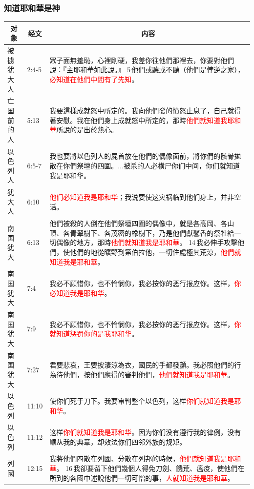 \subsubsection{知道耶和華是神}
\begin{table}[H]
\centering
\begin{tabular}{p{1.5cm}|p{}|p{14.0cm}}\hline\hline
\multicolumn{1}{c|}{对象}&\multicolumn{1}{c|}{经文}&\multicolumn{1}{c}{内容}\\\hline

被掳犹大人&2:4-5&眾子面無羞恥，心裡剛硬，我差你往他們那裡去，你要對他們說：『主耶和華如此說。』 5 他們或聽或不聽（他們是悖逆之家），\textcolor{red}{必知道在他們中間有了先知}。\\\hline


亡国前的人&5:13&我要這樣成就怒中所定的。我向他們發的憤怒止息了，自己就得著安慰。我在他們身上成就怒中所定的，那時\textcolor{red}{他們就知道我耶和華}所說的是出於熱心。\\\hline
以色列人&6:5-7&我也要將以色列人的屍首放在他們的偶像面前，將你們的骸骨拋散在你們祭壇的四圍。...被杀的人必横尸你们中间，你们就知道我是耶和华。\\\hline
犹大人&6:10&\textcolor{red}{他们必知道我是耶和华}；我说要使这灾祸临到他们身上，并非空话。\\\hline

南国犹大&6:13&他們被殺的人倒在他們祭壇四圍的偶像中，就是各高岡、各山頂、各青翠樹下、各茂密的橡樹下，乃是他們獻馨香的祭牲給一切偶像的地方，那時\textcolor{red}{他們就知道我是耶和華}。 14 我必伸手攻擊他們，使他們的地從曠野到第伯拉他，一切住處極其荒涼，\textcolor{red}{他們就知道我是耶和華}。\\\hline

南国犹大&7:4&我必不顾惜你，也不怜悯你，我必按你的恶行报应你。这样，\textcolor{red}{你必知道我是耶和华}。\\\hline

南国犹大&7:9&我必不顾惜你，也不怜悯你，我必按你的恶行报应你。这样，\textcolor{red}{你就知道惩罚你的是我耶和华}。\\\hline
南国犹大&7:27&君要悲哀，王要披淒涼為衣，國民的手都發顫。我必照他們的行為待他們，按他們應得的審判他們，\textcolor{red}{他們就知道我是耶和華}。\\\hline
以色列&11:10&使你们死于刀下。我要审判整个以色列，这样\textcolor{red}{你们就知道我是耶和华}。\\\hline
以色列&11:12&这样\textcolor{red}{你们就知道我是耶和华}。因为你们没有遵行我的律例，没有顺从我的典章，却效法你们四邻外族的规矩。\\\hline
列國&12:15&我將他們四散在列國、分散在列邦的時候，\textcolor{red}{他們就知道我是耶和華}。 16 我卻要留下他們幾個人得免刀劍、饑荒、瘟疫，使他們在所到的各國中述說他們一切可憎的事，\textcolor{red}{人就知道我是耶和華}。\\\hline


\end{tabular}
\end{table}
